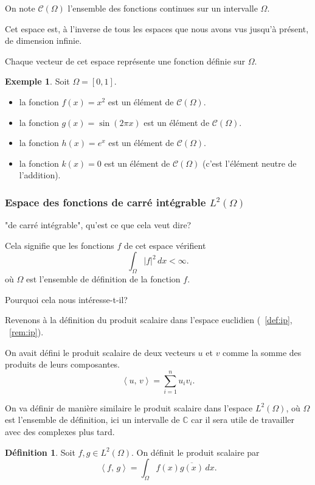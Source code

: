 \documentclass[11pt,a4paper]{article}
\numberwithin{equation}{section}
\theoremstyle{plain}
\theoremstyle{definition}
\newtheorem{definition}[theorem]{Définition}
\newtheorem{example}[theorem]{Exemple}
\theoremstyle{remark}
\newcommand{\C}{\mathbb{C}}
\newcommand{\ip}[2]{\left\langle #1,\, #2\right\rangle}
\begin{document}
On note $\mathcal{C}(\Omega)$ l'ensemble des fonctions continues sur un intervalle $\Omega$.

Cet espace est, à l'inverse de tous les espaces que nous avons vus jusqu'à présent, de dimension infinie.

Chaque vecteur de cet espace représente une fonction définie sur $\Omega$.

\begin{example}
    Soit $\Omega = [0, 1]$.
    \begin{itemize}
        \item la fonction $f(x) = x^2$ est un élément de $\mathcal{C}(\Omega)$.
        \item la fonction $g(x) = \sin(2\pi x)$ est un élément de $\mathcal{C}(\Omega)$.
        \item la fonction $h(x) = e^x$ est un élément de $\mathcal{C}(\Omega)$.
        \item la fonction $k(x) = 0$ est un élément de $\mathcal{C}(\Omega)$ (c'est l'élément neutre de l'addition).
    \end{itemize}
\end{example}

\subsubsection{Espace des fonctions de carré intégrable $L^2(\Omega)$}

"de carré intégrable", qu'est ce que cela veut dire?

Cela signifie que les fonctions $f$ de cet espace vérifient
\[
    \int_\Omega |f|^2 \, dx < \infty.
\]
où $\Omega$ est l'ensemble de définition de la fonction $f$.

Pourquoi cela nous intéresse-t-il?

Revenons à la définition du produit scalaire dans l'espace euclidien (~\ref{def:ip}, ~\ref{rem:ip}).

On avait défini le produit scalaire de deux vecteurs $u$ et $v$ comme la somme des produits de leurs composantes.
\[
    \ip{u}{v} = \sum_{i=1}^n u_i v_i.
\]

On va définir de manière similaire le produit scalaire dans l'espace $L^2(\Omega)$, où $\Omega$ est l'ensemble de définition, ici un intervalle de $\C$ car il sera utile de travailler avec des complexes plus tard.

\begin{definition} \label{def:ip_L2}
    Soit $f,g \in L^2(\Omega)$. On définit le produit scalaire par
    \[
        \ip{f}{g} = \int_\Omega f(x) \overline{g(x)} \, dx.
    \]
\end{definition}
\end{document}
